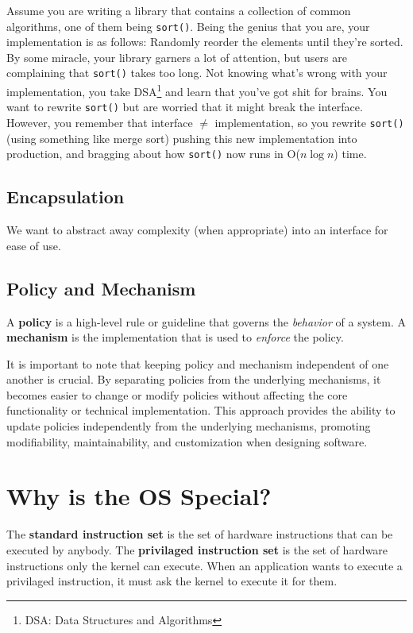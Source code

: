 \documentclass{report}
\begin{document}
\begin{tcolorbox}[colback=blue!5!white,colframe=black!75!blue,title=Example: Sort Swapping]
  Assume you are writing a library that contains a collection of common algorithms, one of them
  being \texttt{sort()}. Being the genius that you are, your implementation is as follows: Randomly
  reorder the elements until they're sorted. By some miracle, your library garners a lot of
  attention, but users are complaining that \texttt{sort()} takes too long. Not knowing what's wrong
  with your implementation, you take DSA\footnote[1]{DSA: Data Structures and Algorithms} 
  and learn that you've got shit for brains. You want to rewrite \texttt{sort()} but are worried
  that it might break the interface. However, you remember that interface $\neq$ implementation, so
  you rewrite \texttt{sort()} (using something like merge sort) pushing this new implementation
  into production, and bragging about how \texttt{sort()} now runs in O($n \log n$) time. 
\end{tcolorbox}


\subsection*{Encapsulation}
We want to abstract away complexity (when appropriate) into an interface for ease of use.


\subsection*{Policy and Mechanism}
\label{subsubsec:PAM}
\begin{tcolorbox}[title=Definition: Policy and Mechanism]
  A \textbf{policy} is a high-level rule or guideline that governs the \textit{behavior} of a
  system.
  \tcblower
  A \textbf{mechanism} is the implementation that is used to \textit{enforce} the policy.
\end{tcolorbox}
It is important to note that keeping policy and mechanism independent of one another is crucial. By
separating policies from the underlying mechanisms, it becomes easier to change or modify policies
without affecting the core functionality or technical implementation. This approach provides the
ability to update policies independently from the underlying mechanisms, promoting modifiability,
maintainability, and customization when designing software.





\section{Why is the OS Special?}
\begin{tcolorbox}[title=Definition: Standard and Privileged Instruction Set]
  The \textbf{standard instruction set} is the set of hardware instructions that can be executed by anybody.
  \tcblower
  The \textbf{privilaged instruction set} is the set of hardware instructions only the kernel can
  execute. When an application wants to execute a privilaged instruction, it must ask the kernel to
  execute it for them.
\end{tcolorbox}
\end{document}
